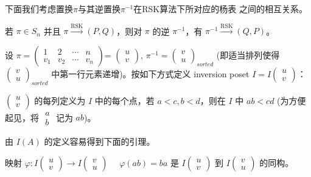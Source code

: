 下面我们考虑置换$\pi$与其逆置换$\pi^{-1 }$在RSK算法下所对应的杨表
之间的相互关系。


\begin{thm} 若 $\pi\in S_n$ 并且
$\pi\xrightarrow{\text{RSK}}(P, Q)$，则对 $\pi$ 的逆 $\pi^{-1 }$，有
$\pi^{-1 }\xrightarrow{\text{RSK}}(Q, P)$。
\end{thm}

\pf 设 $\pi=\left(\begin{array}{cccc}
1&2&\cdots&n\\v_1&v_2&\cdots&v_n\end{array}\right)$=
$\left(\begin{array}{c}
u\\v\end{array}\right)$, $\pi^{-1 }=\left(\begin{array}{c}
v\\u\end{array}\right)_{sorted}$ (即适当排列使得
$\left(\begin{array}{c} v\\u\end{array}\right)_{sorted}$
中第一行元素递增)。按如下方式定义 inversion poset
$I=I\left(\begin{array}{c} u\\v\end{array}\right)$：

$\left(\begin{array}{c} u\\v\end{array}\right)$ 的每列定义为 $I$
中的每个点，若 $a<c, b<d$，则在 $I$ 中 $ab<cd$ (为方便起见，将
$\begin{array}{c} a\\b\end{array}$ 记为 $ab$)。

由 $I(A)$ 的定义容易得到下面的引理。


\begin{lem}  映射 $\varphi: I\left(\begin{array}{c}
u\\v\end{array}\right)\rightarrow I\left(\begin{array}{c}
v\\u\end{array}\right)$ \ \ $\varphi(ab)=ba$ 是
$I\left(\begin{array}{c} u\\v\end{array}\right)$ 到
$I\left(\begin{array}{c} v\\u\end{array}\right)$ 的同构。\end{lem}


